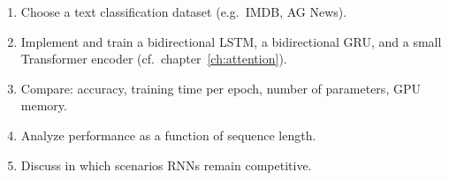 \begin{exercise}
\begin{enumerate}
  \item Choose a text classification dataset (e.g.\ IMDB, AG News).
  \item Implement and train a bidirectional LSTM, a bidirectional GRU,
    and a small Transformer encoder (cf.\ chapter~\ref{ch:attention}).
  \item Compare: accuracy, training time per epoch, number of parameters,
    GPU memory.
  \item Analyze performance as a function of sequence length.
  \item Discuss in which scenarios RNNs remain competitive.
\end{enumerate}
\end{exercise}
